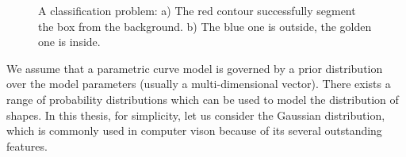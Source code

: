 \begin{figure}[htbp]
  \centering
    \begin{minipage}[t]{0.5\linewidth} 
    \centering 
  \end{minipage}%
  \begin{minipage}[t]{0.5\linewidth} 
    \centering 
  \end{minipage} 
  \caption[A classification problem]{A classification problem: a) The red
    contour successfully segment the box from the background. b) The
    blue one is outside, the golden one is inside.}
  \label{fig:divide}
\end{figure}


We assume that a parametric curve model is governed by a prior distribution
over the model parameters (usually a multi-dimensional vector). There
exists a range of probability distributions which can be used to model
the distribution of shapes. In this thesis, for simplicity, let us
consider the Gaussian distribution, which is commonly used in computer
vison because of its several outstanding features. 



